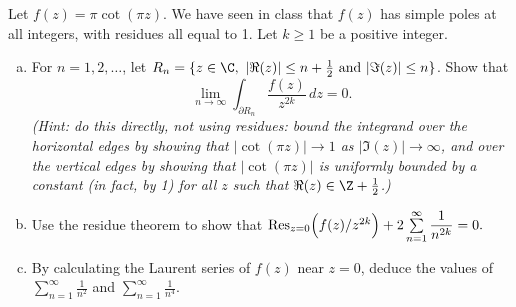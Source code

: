\documentclass[11pt,letterpaper]{article}
\begin{document}
\begin{problem}
    Let $f(z)=\pi \cot(\pi z)$. We have seen in class that $f(z)$ has simple poles at all integers, with residues all equal to 1. Let $k\geq 1$ be a positive integer.
    \begin{enumerate}[(a)]
        \item For $n=1,2,\dots$, let $R_n=\{z\in\C,\ |\Re(z)|\leq n+\frac12\text{ and } |\Im(z)|\leq n\}$. Show that $$\lim\limits_{n\to\infty} \int_{\partial R_n} \frac{f(z)}{z^{2k}}\,dz=0.$$
        \textit{(Hint: do this directly, not using residues: bound the integrand over the horizontal edges by showing that $|\cot(\pi z)|\to 1$ as $|\Im(z)|\to \infty$, and over the vertical edges by showing that $|\cot(\pi z)|$ is uniformly bounded by a constant (in fact, by 1) for all $z$ such that $\Re(z)\in \Z+\frac12$.)}
        \item Use the residue theorem to show that $\mathrm{Res}_{z=0}\Bigl(f(z)/z^{2k}\Bigr) + 2\sum\limits_{n=1}^\infty \dfrac{1}{n^{2k}}=0.$
        \item By calculating the Laurent series of $f(z)$ near $z=0$, deduce the values of $\sum\limits_{n=1}^\infty \frac{1}{n^2}$ and $\sum\limits_{n=1}^\infty \frac{1}{n^4}$.
    \end{enumerate}
\end{problem}
\end{document}
